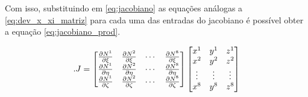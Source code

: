 Com isso, substituindo em \ref{eq:jacobiano} as equações análogas a \ref{eq:dev_x_xi_matriz} para cada uma das entradas do jacobiano é possível obter a equação \ref{eq:jacobiano_prod}.


\begin{equation}\label{eq:jacobiano_prod}.
J = \der
\begin{bmatrix}
x^1 & y^1 & z^1 \\
x^2 & y^2 & z^2 \\
\vdots & \vdots  & \vdots  \\
x^8 & y^8 & z^8 \\
\end{bmatrix}
\end{equation}


